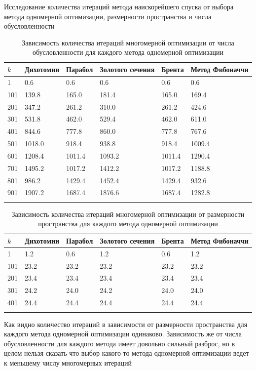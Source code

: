 \documentclass[english]{article}
\begin{document}
Исследование количества итераций метода наискорейшего спуска от выбора
метода одномерной оптимизации, размерности пространства и числа
обусловленности
\begin{center}
  \begin{longtable}{l|lllll}
    \(k\) & Дихотомии & Парабол & Золотого сечения & Брента & Метод Фибоначчи \\
    \hline
    1 & 0.6 & 0.6 & 0.6 & 0.6 & 0.6 \\
    101 & 139.8 & 165.0 & 181.4 & 165.0 & 169.4 \\
    201 & 347.2 & 261.2 & 310.0 & 261.2 & 424.6 \\
    301 & 531.8 & 462.0 & 529.4 & 462.0 & 611.0 \\
    401 & 844.6 & 777.8 & 860.0 & 777.8 & 767.6 \\
    501 & 1018.0 & 918.4 & 938.8 & 918.4 & 1009.4 \\
    601 & 1208.4 & 1011.4 & 1093.2 & 1011.4 & 1290.4 \\
    701 & 1495.2 & 1017.2 & 1412.2 & 1017.2 & 1188.8 \\
    801 & 986.2 & 1429.4 & 1452.4 & 1429.4 & 932.6 \\
    901 & 1907.2 & 1687.4 & 1876.6 & 1687.4 & 1282.8 \\
    \caption{Зависимость количества итераций многомерной оптимизации от числа обусловленности для каждого метода одномерной оптимизации}
  \end{longtable}
\end{center}
\begin{center}
  \begin{longtable}{l|lllll}
    \(k\) & Дихотомии & Парабол & Золотого сечения & Брента & Метод Фибоначчи \\
    \hline
    1 & 1.2 & 0.6 & 1.2 & 0.6 & 1.2 \\
    101 & 23.2 & 23.2 & 23.2 & 23.2 & 23.2 \\
    201 & 23.4 & 23.4 & 23.4 & 23.4 & 23.4 \\
    301 & 24.2 & 24.0 & 24.2 & 24.0 & 24.0 \\
    401 & 24.4 & 24.4 & 24.4 & 24.4 & 24.4 \\
    \caption{Зависимость количества итераций многомерной оптимизации от размерности пространства для каждого метода одномерной оптимизации}
  \end{longtable}
\end{center}

Как видно количество итераций в зависимости от размерности
пространства для каждого метода одномерной оптимизации
одинаково. Зависимость же от числа обусловленности для каждого метода
имеет довольно сильный разброс, но в целом нельзя сказать что выбор
какого-то метода одномерной оптимизации ведет к меньшему числу
многомерных итераций
\end{document}
